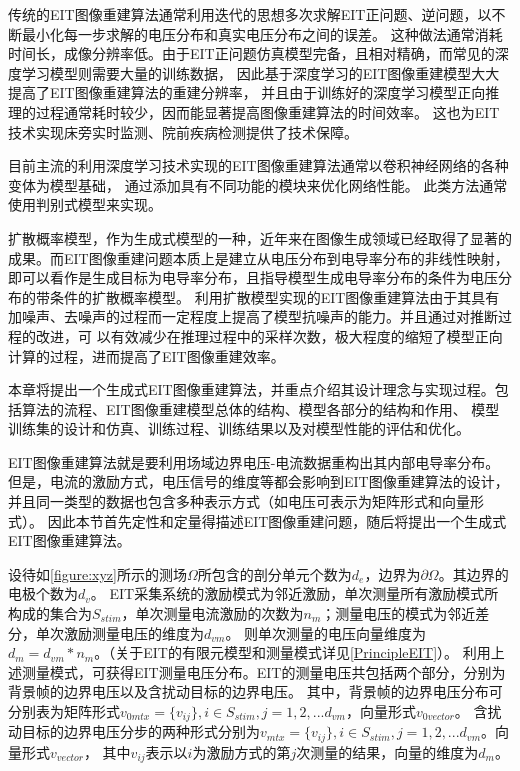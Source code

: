 
传统的EIT图像重建算法通常利用迭代的思想多次求解EIT正问题、逆问题，以不断最小化每一步求解的电压分布和真实电压分布之间的误差。
这种做法通常消耗时间长，成像分辨率低。由于EIT正问题仿真模型完备，且相对精确，而常见的深度学习模型则需要大量的训练数据，
因此基于深度学习的EIT图像重建模型大大提高了EIT图像重建算法的重建分辨率，
并且由于训练好的深度学习模型正向推理的过程通常耗时较少，因而能显著提高图像重建算法的时间效率。
这也为EIT技术实现床旁实时监测、院前疾病检测提供了技术保障。

目前主流的利用深度学习技术实现的EIT图像重建算法通常以卷积神经网络的各种变体为模型基础，
通过添加具有不同功能的模块来优化网络性能。
此类方法通常使用判别式模型来实现。

扩散概率模型，作为生成式模型的一种，近年来在图像生成领域已经取得了显著的成果。而EIT图像重建问题本质上是建立从电压分布到电导率分布的非线性映射，
即可以看作是生成目标为电导率分布，且指导模型生成电导率分布的条件为电压分布的带条件的扩散概率模型。
利用扩散模型实现的EIT图像重建算法由于其具有加噪声、去噪声的过程而一定程度上提高了模型抗噪声的能力。并且通过对推断过程的改进，可
以有效减少在推理过程中的采样次数，极大程度的缩短了模型正向计算的过程，进而提高了EIT图像重建效率。

本章将提出一个生成式EIT图像重建算法，并重点介绍其设计理念与实现过程。包括算法的流程、EIT图像重建模型总体的结构、模型各部分的结构和作用、
模型训练集的设计和仿真、训练过程、训练结果以及对模型性能的评估和优化。




EIT图像重建算法就是要利用场域边界电压-电流数据重构出其内部电导率分布。
但是，电流的激励方式，电压信号的维度等都会影响到EIT图像重建算法的设计，并且同一类型的数据也包含多种表示方式（如电压可表示为矩阵形式和向量形式）。
因此本节首先定性和定量得描述EIT图像重建问题，随后将提出一个生成式EIT图像重建算法。


设待如\cref{figure:xyz}所示的测场$\Omega$所包含的剖分单元个数为$d_e$，边界为$\partial \Omega$。其边界的电极个数为$d_v$。
EIT采集系统的激励模式为邻近激励，单次测量所有激励模式所构成的集合为$S_{stim}$，单次测量电流激励的次数为$n_m$；测量电压的模式为邻近差分，单次激励测量电压的维度为$d_{vm}$。
则单次测量的电压向量维度为$d_m = d_{vm} * n_m$。（关于EIT的有限元模型和测量模式详见\cref{PrincipleEIT}）。
利用上述测量模式，可获得EIT测量电压分布。EIT的测量电压共包括两个部分，分别为背景帧的边界电压以及含扰动目标的边界电压。
其中，背景帧的边界电压分布可分别表为矩阵形式$v_{0mtx} = \{v_{ij}\}, i \in S_{stim}, j =1,2,...d_{vm}$，向量形式$v_{0vector}$。
含扰动目标的边界电压分步的两种形式分别为$v_{mtx} = \{v_{ij}\}, i \in S_{stim}, j =1,2,...d_{vm}$。向量形式$v_{vector}$，
其中$v_{ij}$表示以$i$为激励方式的第$j$次测量的结果，向量的维度为$d_m$。

